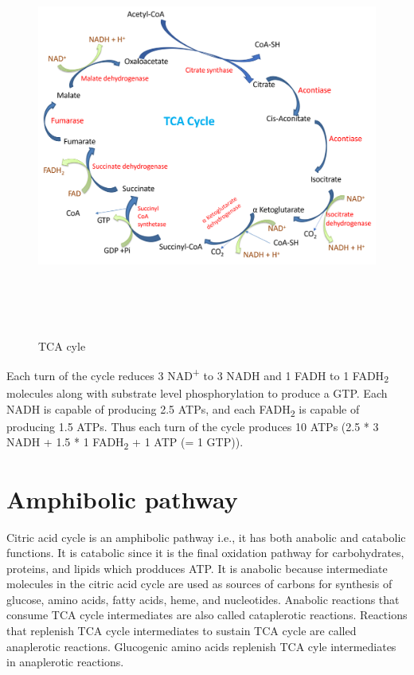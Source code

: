 \documentclass[
]{book}
\begin{document}
\begin{figure}
\centering
\includegraphics[width=\textwidth,height=5.20833in]{Images/TCA.png}
\caption{TCA cyle}
\end{figure}

Each turn of the cycle reduces 3 NAD\textsuperscript{+} to 3 NADH and 1 FADH to 1 FADH\textsubscript{2} molecules along with substrate level phosphorylation to produce a GTP. Each NADH is capable of producing 2.5 ATPs, and each FADH\textsubscript{2} is capable of producing 1.5 ATPs. Thus each turn of the cycle produces 10 ATPs (2.5 * 3 NADH + 1.5 * 1 FADH\textsubscript{2} + 1 ATP (= 1 GTP)).

\section{Amphibolic pathway}\label{amphibolic-pathway}

Citric acid cycle is an amphibolic pathway i.e., it has both anabolic and catabolic functions. It is catabolic since it is the final oxidation pathway for carbohydrates, proteins, and lipids which prodduces ATP. It is anabolic because intermediate molecules in the citric acid cycle are used as sources of carbons for synthesis of glucose, amino acids, fatty acids, heme, and nucleotides. Anabolic reactions that consume TCA cycle intermediates are also called cataplerotic reactions. Reactions that replenish TCA cycle intermediates to sustain TCA cycle are called anaplerotic reactions. Glucogenic amino acids replenish TCA cyle intermediates in anaplerotic reactions.
\end{document}
